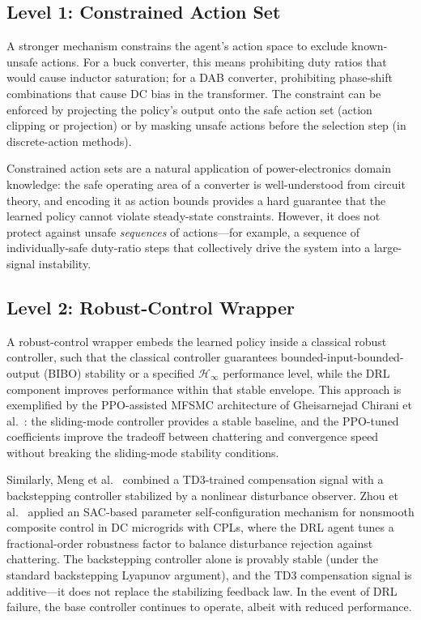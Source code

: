 \documentclass[manuscript,screen,review]{acmart}
\begin{document}
\subsection{Level 1: Constrained Action Set}

A stronger mechanism constrains the agent's action space to exclude known-unsafe actions.
For a buck converter, this means prohibiting duty ratios that would cause inductor saturation; for a DAB converter, prohibiting phase-shift combinations that cause DC bias in the transformer.
The constraint can be enforced by projecting the policy's output onto the safe action set (action clipping or projection) or by masking unsafe actions before the selection step (in discrete-action methods).

Constrained action sets are a natural application of power-electronics domain knowledge: the safe operating area of a converter is well-understood from circuit theory, and encoding it as action bounds provides a hard guarantee that the learned policy cannot violate steady-state constraints.
However, it does not protect against unsafe \emph{sequences} of actions---for example, a sequence of individually-safe duty-ratio steps that collectively drive the system into a large-signal instability.

\subsection{Level 2: Robust-Control Wrapper}

A robust-control wrapper embeds the learned policy inside a classical robust controller, such that the classical controller guarantees bounded-input-bounded-output (BIBO) stability or a specified $\mathcal{H}_\infty$ performance level, while the DRL component improves performance within that stable envelope.
This approach is exemplified by the PPO-assisted MFSMC architecture of Gheisarnejad Chirani et al.~\cite{gheisarnejad2022reducing}: the sliding-mode controller provides a stable baseline, and the PPO-tuned coefficients improve the tradeoff between chattering and convergence speed without breaking the sliding-mode stability conditions.

Similarly, Meng et al.~\cite{meng2022novel} combined a TD3-trained compensation signal with a backstepping controller stabilized by a nonlinear disturbance observer.
Zhou et al.~\cite{zhou2023drl} applied an SAC-based parameter self-configuration mechanism for nonsmooth composite control in DC microgrids with CPLs, where the DRL agent tunes a fractional-order robustness factor to balance disturbance rejection against chattering.
The backstepping controller alone is provably stable (under the standard backstepping Lyapunov argument), and the TD3 compensation signal is additive---it does not replace the stabilizing feedback law.
In the event of DRL failure, the base controller continues to operate, albeit with reduced performance.
\end{document}
